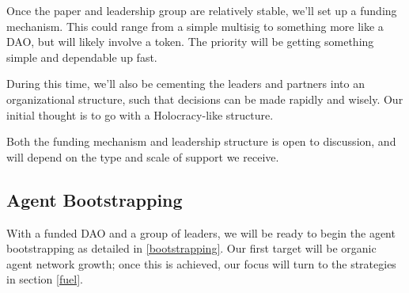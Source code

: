 \documentclass{article}
\begin{document}
Once the paper and leadership group are relatively stable, we'll set up a funding mechanism. This could range from a simple multisig to something more like a DAO, but will likely involve a token. The priority will be getting something simple and dependable up fast.

During this time, we'll also be cementing the leaders and partners into an organizational structure, such that decisions can be made rapidly and wisely. Our initial thought is to go with a Holocracy-like structure.

Both the funding mechanism and leadership structure is open to discussion, and will depend on the type and scale of support we receive.

\subsection{Agent Bootstrapping} \label{agent bootstrapping}

With a funded DAO and a group of leaders, we will be ready to begin the agent bootstrapping as detailed in \ref{bootstrapping}. Our first target will be organic agent network growth; once this is achieved, our focus will turn to the strategies in section \ref{fuel}.
\end{document}
